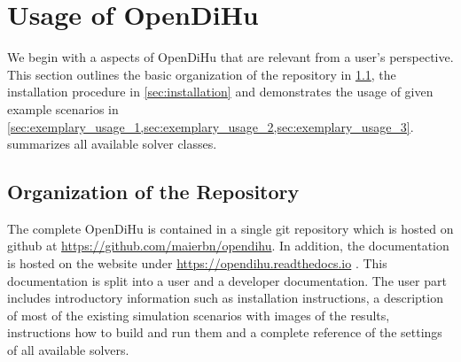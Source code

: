 
\section{Usage of OpenDiHu}\label{sec:usage}
We begin with a aspects of OpenDiHu that are relevant from a user's perspective. This section outlines the basic organization of the repository in \cref{sec:organization_of_the_directory}, the installation procedure in \cref{sec:installation} and demonstrates the usage of given example scenarios in \cref{sec:exemplary_usage_1,sec:exemplary_usage_2,sec:exemplary_usage_3}.  summarizes all available solver classes.

\subsection{Organization of the Repository}\label{sec:organization_of_the_directory}
The complete OpenDiHu is contained in a single git repository which is hosted on github at \url{https://github.com/maierbn/opendihu}. In addition, the documentation is hosted on the  website under \url{https://opendihu.readthedocs.io} \cite{opendihuWeb}. This documentation is split into a user and a developer documentation. The user part includes introductory information such as installation instructions, a description of most of the existing simulation scenarios with images of the results, instructions how to build and run them and a complete reference of the settings of all available solvers.

